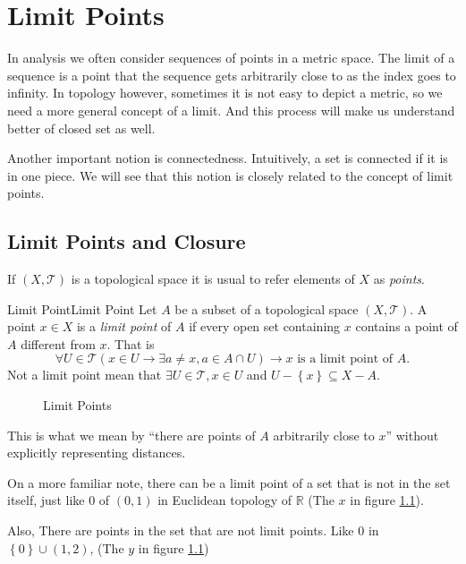 \documentclass[../main.tex]{subfiles}
\begin{document}
\chapter{Limit Points}

In analysis we often consider sequences of points in a metric space.  The limit of a sequence is a point that the sequence gets arbitrarily close to as the index goes to infinity. In topology however, sometimes it is not easy to depict a metric, so we need a more general concept of a limit. And this process will make us understand better of closed set as well.

Another important notion is connectedness. Intuitively, a set is connected if it is in one piece. We will see that this notion is closely related to the concept of limit points.

\section{Limit Points and Closure}
If $(X,\mathcal{T})$ is a topological space it is usual to refer elements of $X$ as \emph{points}.
\begin{definition}{Limit Point}{Limit Point}
	Let $A$ be a subset of a topological space $(X,\mathcal{T})$. A point $x\in X$ is a \emph{limit point} of $A$ if every open set containing $x$ contains a point of $A$ different from $x$. That is
	\begin{equation*}
		\forall U\in \mathcal{T}(x\in U \rightarrow \exists a\neq x, a \in A\cap U) \rightarrow x \text{ is a limit point of } A.
	\end{equation*}
	Not a limit point mean that $\exists U\in \mathcal{T}, x\in U$ and $U-\left\{ x \right\} \subseteq X-A$.
\end{definition}
\begin{figure}[H]
    \centering
    \caption{Limit Points}
    \label{fig:limit-points}
\end{figure}
\begin{remark}
	This is what we mean by ``there are points of $A$ arbitrarily close to $x$'' without explicitly representing distances. 

	On a more familiar note, there can be a limit point of a set that is not in the set itself, just like $0$ of $(0,1)$ in Euclidean topology of $\mathbb{R}$ (The $x$ in figure \ref{fig:limit-points}). 

	Also, There are points in the set that are not limit points. Like $0$ in $\left\{ 0 \right\}\cup (1,2)$, (The $y$ in figure \ref{fig:limit-points})
\end{remark}
\end{document}
